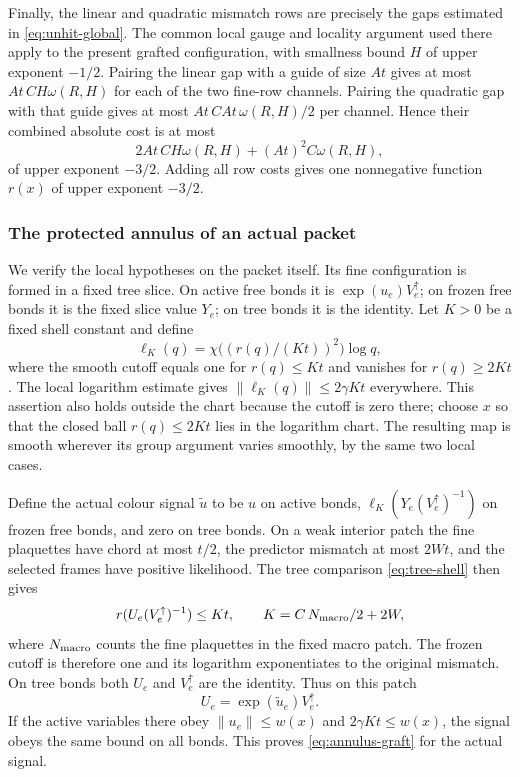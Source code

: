 Finally, the linear and quadratic mismatch rows are precisely the
gaps estimated in \eqref{eq:unhit-global}. The common local gauge
and locality argument used there apply to the present grafted
configuration, with smallness bound $H$ of upper exponent $-1/2$.
Pairing the linear gap with a guide of size $At$ gives at most
$At\,CH\omega(R,H)$ for each of the two fine-row channels.
Pairing the quadratic gap with that guide gives at most
$At\,CAt\,\omega(R,H)/2$ per channel. Hence their combined
absolute cost is at most
\[
 2At\,CH\omega(R,H)+(At)^2C\omega(R,H),
\]
of upper exponent $-3/2$. Adding all row costs gives one
nonnegative function $r(x)$ of upper exponent $-3/2$.

\subsubsection{The protected annulus of an actual packet}
We verify the local hypotheses on the packet itself. Its fine
configuration is formed in a fixed tree slice. On active free
bonds it is $\exp(u_e)V^\uparrow_e$; on frozen free bonds it is
the fixed slice value $Y_e$; on tree bonds it is the identity.
Let $K>0$ be a fixed shell constant and define
\[
 \ell_K(q)=\chi\bigl((r(q)/(Kt))^2\bigr)\log q,
\]
where the smooth cutoff equals one for $r(q)\le Kt$ and vanishes
for $r(q)\ge2Kt$. The local logarithm estimate gives
$\|\ell_K(q)\|\le2\gamma Kt$ everywhere. This assertion
also holds outside the chart because the cutoff is zero there;
choose $x$ so that the closed ball $r(q)\le2Kt$ lies in the
logarithm chart. The resulting map is smooth wherever its group
argument varies smoothly, by the same two local cases.

Define the actual colour signal $\widetilde u$ to be $u$ on
active bonds, $\ell_K(Y_e(V^\uparrow_e)^{-1})$ on frozen free
bonds, and zero on tree bonds. On a weak interior patch the
fine plaquettes have chord at most $t/2$, the predictor mismatch
at most $2Wt$, and the selected frames have positive likelihood.
The tree comparison \eqref{eq:tree-shell} then gives
\[
 r(U_e(V^\uparrow_e)^{-1})
 \le Kt,\qquad K=C\,N_{\rm macro}/2+2W,
\]
where $N_{\rm macro}$ counts the fine plaquettes in the fixed
macro patch. The frozen cutoff is therefore one and its logarithm
exponentiates to the original mismatch. On tree bonds both
$U_e$ and $V^\uparrow_e$ are the identity. Thus on this patch
\[
 U_e=\exp(\widetilde u_e)V^\uparrow_e.
\]
If the active variables there obey $\|u_e\|\le w(x)$ and
$2\gamma Kt\le w(x)$, the signal obeys the same bound on all
bonds. This proves \eqref{eq:annulus-graft} for the actual signal.

